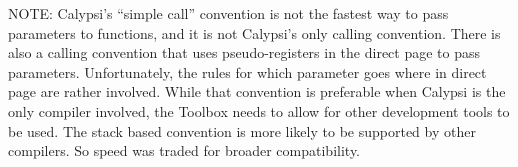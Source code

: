 NOTE: Calypsi's ``simple call'' convention is not the fastest way to pass parameters to functions, and it is not Calypsi's only calling convention. There is also a calling convention that uses pseudo-registers in the direct page to pass parameters. Unfortunately, the rules for which parameter goes where in direct page are rather involved. While that convention is preferable when Calypsi is the only compiler involved, the Toolbox needs to allow for other development tools to be used. The stack based convention is more likely to be supported by other compilers. So speed was traded for broader compatibility.







